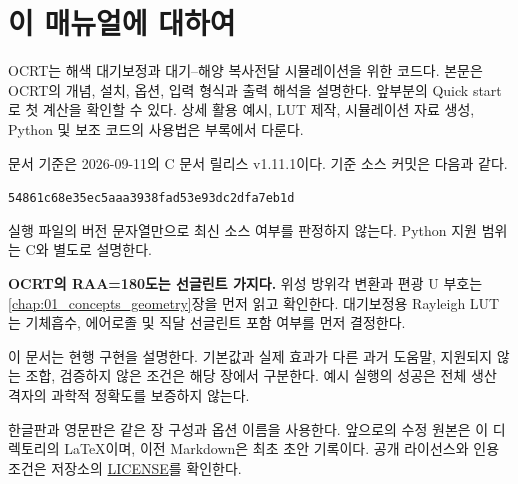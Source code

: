 \documentclass[11pt,a4paper,oneside]{report}
\begin{document}
\chapter*{이 매뉴얼에 대하여}
OCRT는 해색 대기보정과 대기--해양 복사전달 시뮬레이션을 위한 코드다. 본문은 OCRT의 개념, 설치, 옵션, 입력 형식과 출력 해석을 설명한다. 앞부분의 Quick start로 첫 계산을 확인할 수 있다. 상세 활용 예시, LUT 제작, 시뮬레이션 자료 생성, Python 및 보조 코드의 사용법은 부록에서 다룬다.

문서 기준은 2026-09-11의 C 문서 릴리스 v1.11.1이다. 기준 소스 커밋은 다음과 같다.

\texttt{54861c68e35ec5aaa3938fad53e93dc2dfa7eb1d}

실행 파일의 버전 문자열만으로 최신 소스 여부를 판정하지 않는다. Python 지원 범위는 C와 별도로 설명한다.

\textbf{OCRT의 RAA=180도는 선글린트 가지다.} 위성 방위각 변환과 편광 U 부호는 \ref{chap:01_concepts_geometry}장을 먼저 읽고 확인한다. 대기보정용 Rayleigh LUT는 기체흡수, 에어로졸 및 직달 선글린트 포함 여부를 먼저 결정한다.

이 문서는 현행 구현을 설명한다. 기본값과 실제 효과가 다른 과거 도움말, 지원되지 않는 조합, 검증하지 않은 조건은 해당 장에서 구분한다. 예시 실행의 성공은 전체 생산 격자의 과학적 정확도를 보증하지 않는다.

한글판과 영문판은 같은 장 구성과 옵션 이름을 사용한다. 앞으로의 수정 원본은 이 디렉토리의 LaTeX이며, 이전 Markdown은 최초 초안 기록이다. 공개 라이선스와 인용 조건은 저장소의 \href{https://github.com/brtnt/OCRT/blob/main/LICENSE}{LICENSE}를 확인한다.
\tableofcontents
\clearpage

\clearpage{}






\appendix





\end{document}
